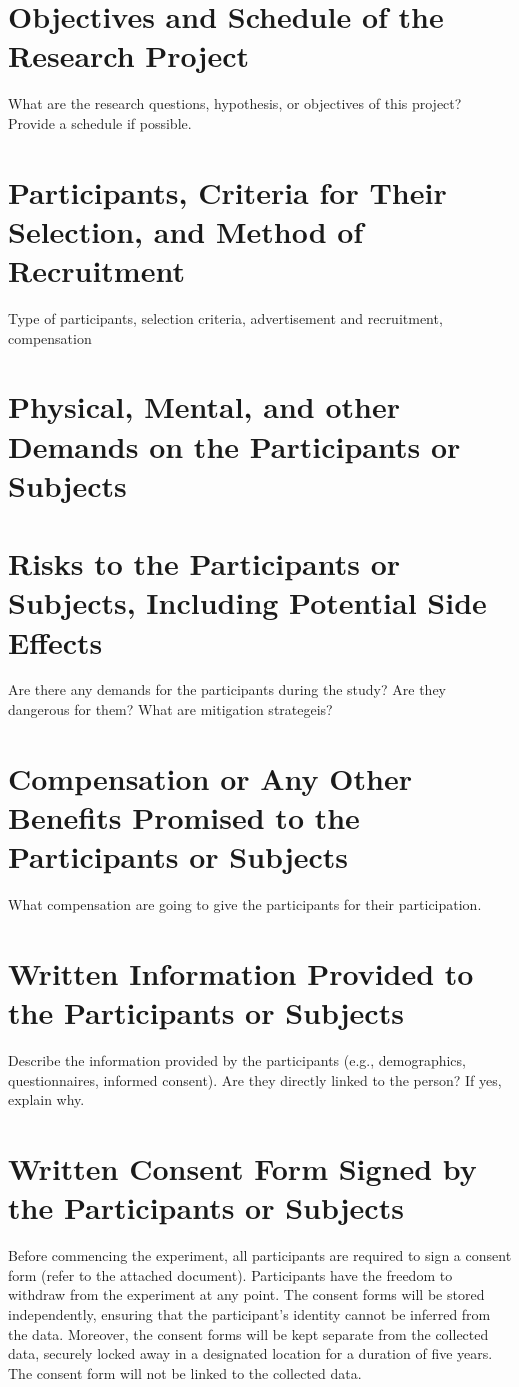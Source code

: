 \documentclass[letterpaper]{article}
\begin{document}

 

\section{Objectives and Schedule of the Research Project}
What are the research questions, hypothesis, or objectives of this project? Provide a schedule if possible.

\section{Participants, Criteria for Their Selection, and Method of Recruitment}
Type of participants, selection criteria, advertisement and recruitment, compensation

\section{Physical, Mental, and other Demands on the Participants or Subjects}

\section{Risks to the Participants or Subjects, Including Potential Side Effects}
Are there any demands for the participants during the study? Are they dangerous for them? What are mitigation strategeis?

\section{Compensation or Any Other Benefits Promised to the Participants or Subjects}
What compensation are going to give the participants for their participation.


\section{Written Information Provided to the Participants or Subjects}
Describe the information provided by the participants (e.g., demographics, questionnaires, informed consent). Are they directly linked to the person? If yes, explain why.


\section{Written Consent Form Signed by the Participants or Subjects}
Before commencing the experiment, all participants are required to sign a consent form (refer to the attached document). Participants have the freedom to withdraw from the experiment at any point. The consent forms will be stored independently, ensuring that the participant's identity cannot be inferred from the data. Moreover, the consent forms will be kept separate from the collected data, securely locked away in a designated location for a duration of five years. The consent form will not be linked to the collected data.
\end{document}
